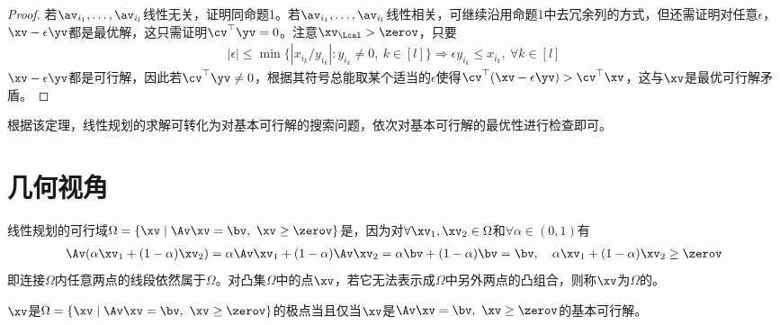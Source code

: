 \documentclass{ctexart}
\begin{document}
\begin{proof}
    若$\av_{i_1}, \ldots, \av_{i_l}$线性无关，证明同命题1。若$\av_{i_1}, \ldots, \av_{i_l}$线性相关，可继续沿用命题1中去冗余列的方式，但还需证明对任意$\epsilon$，$\xv - \epsilon \yv$都是最优解，这只需证明$\cv^\top \yv = 0$。注意$\xv_\Lcal > \zerov$，只要
    \begin{align*}
        |\epsilon| \le \min\{ | x_{i_k} / y_{i_k} | : y_{i_k} \ne 0, ~ k \in [l] \} \Longrightarrow \epsilon y_{i_k} \le x_{i_k}, ~ \forall k \in [l]
    \end{align*}
    $\xv - \epsilon \yv$都是可行解，因此若$\cv^\top \yv \ne 0$，根据其符号总能取某个适当的$\epsilon$使得$\cv^\top (\xv - \epsilon \yv) > \cv^\top \xv$，这与$\xv$是最优可行解矛盾。

\end{proof}

根据该定理，线性规划的求解可转化为对基本可行解的搜索问题，依次对基本可行解的最优性进行检查即可。

\section{几何视角}

线性规划的可行域$\Omega = \{ \xv \mid \Av \xv = \bv, ~ \xv \ge \zerov \}$是，因为对$\forall \xv_1, \xv_2 \in \Omega$和$\forall \alpha \in (0,1)$有
\begin{align*}
    \Av (\alpha \xv_1 + (1 - \alpha) \xv_2) = \alpha \Av \xv_1 + (1 - \alpha) \Av \xv_2 = \alpha \bv + (1 - \alpha) \bv = \bv, \quad \alpha \xv_1 + (1 - \alpha) \xv_2 \ge \zerov
\end{align*}
即连接$\Omega$内任意两点的线段依然属于$\Omega$。对凸集$\Omega$中的点$\xv$，若它无法表示成$\Omega$中另外两点的凸组合，则称$\xv$为$\Omega$的。

\begin{theorem} [等价性]
    $\xv$是$\Omega = \{ \xv \mid \Av \xv = \bv, ~ \xv \ge \zerov \}$的极点当且仅当$\xv$是$\Av \xv = \bv, ~ \xv \ge \zerov$的基本可行解。
\end{theorem}
\end{document}
